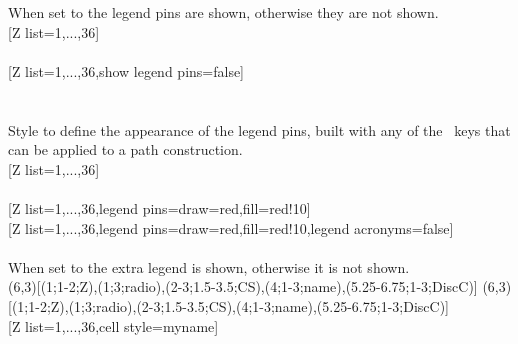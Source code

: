 \label{option_show legend pins}%
%
{When set to  the legend pins are shown, otherwise they are not shown.}%
\\ [5pt][Z list={1,...,36}]%
\\ [5pt]\makebox[\linewidth][c]{\scalebox{.6}{\pgfPT[Z list={1,...,36}]}}%
\\ [5pt][Z list={1,...,36},show legend pins=false]%
\\ [5pt]\makebox[\linewidth][c]{\scalebox{.6}{\pgfPT[Z list={1,...,36},show legend pins=false]}}%
\\ [-5pt]\pgfPTendoption%
\label{style_legend pins}%
%
{\ \\ [4pt]Style to define the appearance of the legend pins, built with any of the \txttikz\ keys that can be applied to a path construction.}%
\\ [5pt][Z list={1,...,36}]%
\\ [5pt]\makebox[\linewidth][c]{\scalebox{.6}{\pgfPT[Z list={1,...,36}]}}%
\\ [5pt][Z list={1,...,36},legend pins={draw=red,fill=red!10}]%
\\ [5pt]\makebox[\linewidth][c]{\scalebox{.6}{\pgfPT[Z list={1,...,36},legend pins={draw=red,fill=red!10}]}}%
\newpage%
[Z list={1,...,36},legend pins={draw=red,fill=red!10},legend acronyms=false]%
\\ [5pt]\makebox[\linewidth][c]{\scalebox{.6}{\pgfPT[Z list={1,...,36},legend pins={draw=red,fill=red!10},legend acronyms=false]}}%
\\ [0pt]\pgfPTendstyle%
\label{option_show extra legend}%
%
{When set to  the extra legend is shown, otherwise it is not shown.}%
\\ [10pt](6,3)[(1;1-2;Z),(1;3;radio),(2-3;1.5-3.5;CS),(4;1-3;name),(5.25-6.75;1-3;DiscC)]%
(6,3)[(1;1-2;Z),(1;3;radio),(2-3;1.5-3.5;CS),(4;1-3;name),(5.25-6.75;1-3;DiscC)]%
\\ [-4pt][Z list={1,...,36},cell style=myname]%
\\ [5pt]\makebox[\linewidth][c]{\scalebox{.6}{\pgfPT[Z list={1,...,36},cell style=myname]}}%
